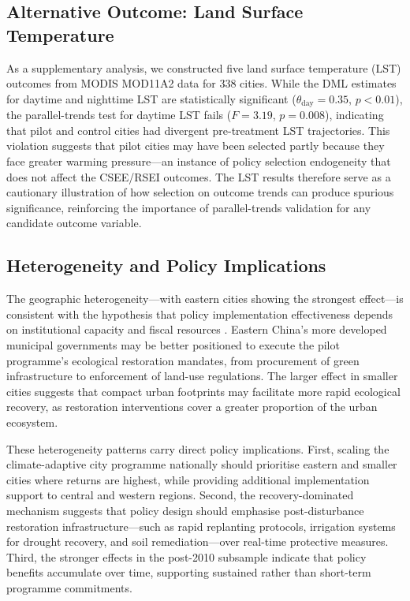 \subsection{Alternative Outcome: Land Surface Temperature}

As a supplementary analysis, we constructed five land surface
temperature (LST) outcomes from MODIS MOD11A2 data for 338 cities.
While the DML estimates for daytime and nighttime LST are
statistically significant ($\theta_{\mathrm{day}} = 0.35$,
$p < 0.01$), the parallel-trends test for daytime LST fails
($F = 3.19$, $p = 0.008$), indicating that pilot and control cities
had divergent pre-treatment LST trajectories. This violation suggests
that pilot cities may have been selected partly because they face
greater warming pressure---an instance of policy selection
endogeneity that does not affect the CSEE/RSEI outcomes. The LST
results therefore serve as a cautionary illustration of how
selection on outcome trends can produce spurious significance,
reinforcing the importance of parallel-trends validation for any
candidate outcome variable.

\subsection{Heterogeneity and Policy Implications}

The geographic heterogeneity---with eastern cities showing the
strongest effect---is consistent with the hypothesis that policy
implementation effectiveness depends on institutional capacity and
fiscal resources \citep{lu2024spatiotemporal,zhao2025coevolution}.
Eastern China's more developed municipal governments may be better
positioned to execute the pilot programme's ecological restoration
mandates, from procurement of green infrastructure to enforcement of
land-use regulations. The larger effect in smaller cities suggests
that compact urban footprints may facilitate more rapid ecological
recovery, as restoration interventions cover a greater proportion of
the urban ecosystem.

These heterogeneity patterns carry direct policy implications. First,
scaling the climate-adaptive city programme nationally should
prioritise eastern and smaller cities where returns are highest, while
providing additional implementation support to central and western
regions. Second, the recovery-dominated mechanism suggests that policy
design should emphasise post-disturbance restoration
infrastructure---such as rapid replanting protocols, irrigation
systems for drought recovery, and soil remediation---over real-time
protective measures. Third, the stronger effects in the post-2010
subsample indicate that policy benefits accumulate over time,
supporting sustained rather than short-term programme commitments.

